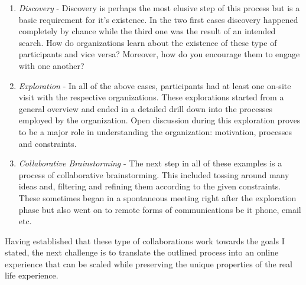 \begin{enumerate}

\item \textit{Discovery} - Discovery is perhaps the most elusive step of this process but is a basic requirement for it's existence. In the two first cases discovery happened completely by chance while the third one was the result of an intended search. How do organizations learn about the existence of these type of participants and vice versa? Moreover, how do you encourage them to engage with one another? 

\item \textit{Exploration} - In all of the above cases, participants had at least one on-site visit with the respective organizations. These explorations started from a general overview and ended in a detailed drill down into the processes employed by the organization. Open discussion during this exploration proves to be a major role in understanding the organization: motivation, processes and constraints. 

\item \textit{Collaborative Brainstorming} - The next step in all of these examples is a process of collaborative brainstorming. This included tossing around many ideas and, filtering and refining them according to the given constraints. These sometimes began in a spontaneous meeting right after the exploration phase but also went on to remote forms of communications be it phone, email etc.

\end{enumerate}
 
Having established that these type of collaborations work towards the goals I stated, the next challenge is to translate the outlined process into an online experience that can be scaled while preserving the unique properties of the real life experience. 